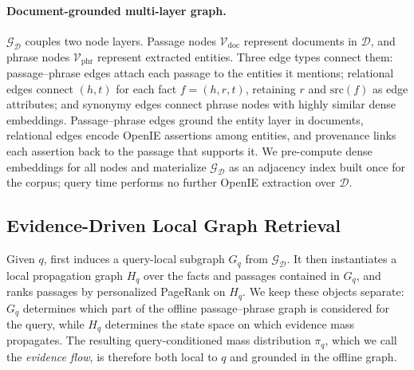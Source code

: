 \paragraph{Document-grounded multi-layer graph.}
$\mathcal{G}_{\mathcal{D}}$ couples two node layers. Passage nodes
$\mathcal{V}_{\mathrm{doc}}$ represent documents in $\mathcal{D}$, and
phrase nodes $\mathcal{V}_{\mathrm{phr}}$ represent extracted entities.
Three edge types connect them: passage--phrase edges attach each passage
to the entities it mentions; relational edges connect $(h,t)$ for each
fact $f=(h,r,t)$, retaining $r$ and $\mathrm{src}(f)$ as edge attributes;
and synonymy edges connect phrase nodes with highly similar dense
embeddings. Passage--phrase edges ground the entity layer in documents,
relational edges encode OpenIE assertions among entities, and provenance
links each assertion back to the passage that supports it. We pre-compute
dense embeddings for all nodes and materialize
$\mathcal{G}_{\mathcal{D}}$ as an adjacency index built once for the
corpus; query time performs no further OpenIE extraction over
$\mathcal{D}$.

\subsection{Evidence-Driven Local Graph Retrieval}
\label{sec:method:retrieval}

Given $q$, \methodname{} first induces a query-local subgraph $G_q$ from
$\mathcal{G}_{\mathcal{D}}$. It then instantiates a local propagation
graph $H_q$ over the facts and passages contained in $G_q$, and ranks
passages by personalized PageRank on $H_q$. We keep these objects
separate: $G_q$ determines which part of the offline passage--phrase
graph is considered for the query, while $H_q$ determines the state space
on which evidence mass propagates. The resulting query-conditioned mass
distribution $\pi_q$, which we call the \emph{evidence flow}, is
therefore both local to $q$ and grounded in the offline graph.


